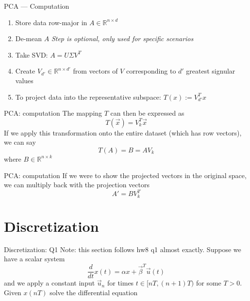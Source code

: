 \documentclass{beamer}
\begin{document}
\begin{frame}{PCA --- Computation}
\begin{enumerate}[<+->]
\item Store data row-major in $A \in \mathbb{R}^{n \times d}$
\item De-mean $A$ \hfill \textit{Step is optional, only used for specific scenarios}
\item Take SVD: $A = U \Sigma V^T$
\item Create $V_{d'} \in \mathbb{R}^{n \times d'}$ from vectors of $V$ corresponding to $d'$ greatest signular values
\item To project data into the representative subspace: $T(x) := V_{d'}^T x$
\end{enumerate}
\end{frame}

\begin{frame}{PCA: computation}
The mapping $T$ can then be expressed as
\[ T(\vec{x}) = V_k^T \vec{x} \]
If we apply this transformation onto the entire dataset (which has row vectors), we can say
\[ T(A) = B = A V_k \]
where $B \in \mathbb{R}^{n \times k}$
\end{frame}
\begin{frame}{PCA: computation}
If we were to show the projected vectors in the original space, we can multiply back with the projection vectors
\[ A' = B V_k^T \]
\end{frame}

\section{Discretization}

\begin{frame}{Discretization: Q1}
Note: this section follows hw8 q1 almost exactly. Suppose we have a scalar system
\[ \frac{d}{dt} x(t) = \alpha x + \vec{\beta}^T \vec u(t) \]
and we apply a constant input $\vec{u}_n$ for times $t \in [nT, (n + 1)T)$ for some $T > 0$. Given $x(nT)$ solve the differential equation
\end{frame}
\end{document}
